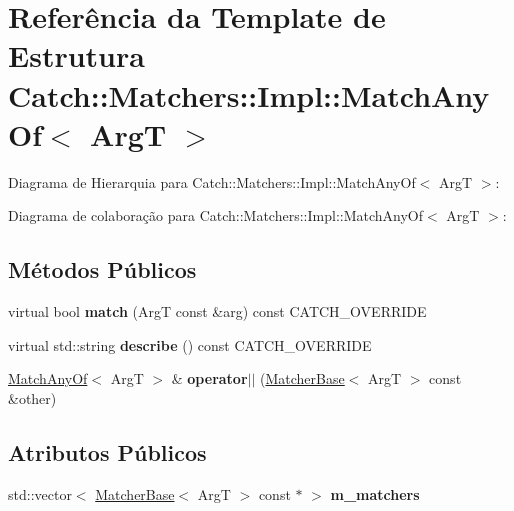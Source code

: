 \hypertarget{structCatch_1_1Matchers_1_1Impl_1_1MatchAnyOf}{}\section{Referência da Template de Estrutura Catch\+:\+:Matchers\+:\+:Impl\+:\+:Match\+Any\+Of$<$ ArgT $>$}
\label{structCatch_1_1Matchers_1_1Impl_1_1MatchAnyOf}


Diagrama de Hierarquia para Catch\+:\+:Matchers\+:\+:Impl\+:\+:Match\+Any\+Of$<$ ArgT $>$\+:


Diagrama de colaboração para Catch\+:\+:Matchers\+:\+:Impl\+:\+:Match\+Any\+Of$<$ ArgT $>$\+:
\subsection*{Métodos Públicos}
\begin{DoxyCompactItemize}
\item 
virtual bool {\bfseries match} (ArgT const \&arg) const C\+A\+T\+C\+H\+\_\+\+O\+V\+E\+R\+R\+I\+DE\hypertarget{structCatch_1_1Matchers_1_1Impl_1_1MatchAnyOf_a73be317ecf5919af855af96d68e714b9}{}\label{structCatch_1_1Matchers_1_1Impl_1_1MatchAnyOf_a73be317ecf5919af855af96d68e714b9}

\item 
virtual std\+::string {\bfseries describe} () const C\+A\+T\+C\+H\+\_\+\+O\+V\+E\+R\+R\+I\+DE\hypertarget{structCatch_1_1Matchers_1_1Impl_1_1MatchAnyOf_a020f5d7889d8cd8be9ad309c690147b6}{}\label{structCatch_1_1Matchers_1_1Impl_1_1MatchAnyOf_a020f5d7889d8cd8be9ad309c690147b6}

\item 
\hyperlink{structCatch_1_1Matchers_1_1Impl_1_1MatchAnyOf}{Match\+Any\+Of}$<$ ArgT $>$ \& {\bfseries operator$\vert$$\vert$} (\hyperlink{structCatch_1_1Matchers_1_1Impl_1_1MatcherBase}{Matcher\+Base}$<$ ArgT $>$ const \&other)\hypertarget{structCatch_1_1Matchers_1_1Impl_1_1MatchAnyOf_a44d7582dbe09fc31b9a5ba8a6367b506}{}\label{structCatch_1_1Matchers_1_1Impl_1_1MatchAnyOf_a44d7582dbe09fc31b9a5ba8a6367b506}

\end{DoxyCompactItemize}
\subsection*{Atributos Públicos}
\begin{DoxyCompactItemize}
\item 
std\+::vector$<$ \hyperlink{structCatch_1_1Matchers_1_1Impl_1_1MatcherBase}{Matcher\+Base}$<$ ArgT $>$ const $\ast$ $>$ {\bfseries m\+\_\+matchers}\hypertarget{structCatch_1_1Matchers_1_1Impl_1_1MatchAnyOf_a1fb1119e6110dc15b8d5262ec0aeddd5}{}\label{structCatch_1_1Matchers_1_1Impl_1_1MatchAnyOf_a1fb1119e6110dc15b8d5262ec0aeddd5}

\end{DoxyCompactItemize}
